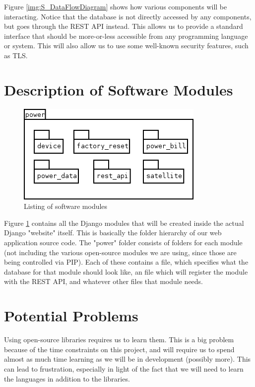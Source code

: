 Figure \ref{img:S_DataFlowDiagram} shows how various components will be interacting.
Notice that the database is not directly accessed by any components, but goes through the \ac{REST} \ac{API} instead.
This allows us to provide a standard interface that should be more-or-less accessible from any programming language or system.
This will also allow us to use some well-known security features, such as \ac{TLS}.

\section{Description of Software Modules}

\begin{figure}[H]
\centering
\includegraphics[scale=0.75]{Software/images/Power-Package-Listing.png}
\caption{Listing of software modules}
\label{img:S_PackageListing}
\end{figure}

Figure \ref{img:S_PackageListing} contains all the Django modules that will be created inside the actual Django "website" itself.
This is basically the folder hierarchy of our web application source code.
The "power" folder consists of folders for each module (not including the various open-source modules we are using, since those are being controlled via \ac{PIP}).
Each of these contains a  file, which specifies what the database for that module should look like, an  file which will register the module with the \ac{REST} \ac{API}, and whatever other files that module needs.


\section{Potential Problems}

Using open-source libraries requires us to learn them.
This is a big problem because of the time constraints on this project, and will require us to spend almost as much time learning as we will be in development (possibly more).
This can lead to frustration, especially in light of the fact that we will need to learn the languages in addition to the libraries.

